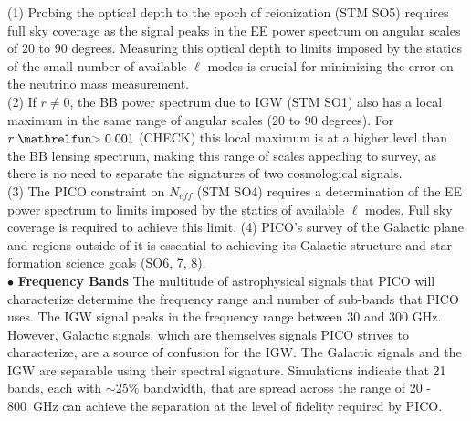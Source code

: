 \documentclass[PICOReport.tex]{subfiles}
\begin{document}
(1) Probing the optical depth to the epoch of reionization (STM SO5) requires full sky 
coverage as the signal peaks in the EE power spectrum on angular scales of 20 to 90 degrees. Measuring 
this optical depth to limits imposed by the statics of the small number of available $\ell$ modes is crucial 
for minimizing the error on the neutrino mass measurement. \\   
(2) If $r \ne 0 $, the BB power spectrum due to IGW (STM SO1) also has a local maximum in the same
range of angular scales (20 to 90 degrees). For $r \simgt 0.001$ (CHECK)
this local maximum is at a higher level than the BB lensing spectrum, making this range of scales appealing 
to survey, as there is no need to separate the signatures of two cosmological signals. \\
(3) The PICO constraint on $N_{eff}$ (STM SO4) requires a determination of the EE power spectrum to limits
imposed by the statics of available $\ell$ modes. Full sky coverage is required to achieve this limit.  
(4) PICO's survey of the Galactic plane and regions outside of it is essential to achieving its Galactic structure 
and star formation science goals (SO6, 7, 8). \\
%
$\bullet$ {\bf Frequency Bands} \hspace{0.1in} The multitude of astrophysical signals that PICO will characterize 
determine the frequency range and number of sub-bands that PICO uses. The IGW signal peaks 
in the frequency range between 30 and 300 GHz. However, Galactic signals, which are themselves signals PICO strives to 
characterize, are a source of confusion for the IGW. The Galactic signals and the IGW are separable using their 
spectral signature. Simulations indicate that 21 bands, each with $\sim$25\% bandwidth, that are spread across 
the range of 20 - 800~GHz can achieve the separation at the level of fidelity required by PICO. 
\end{document}
